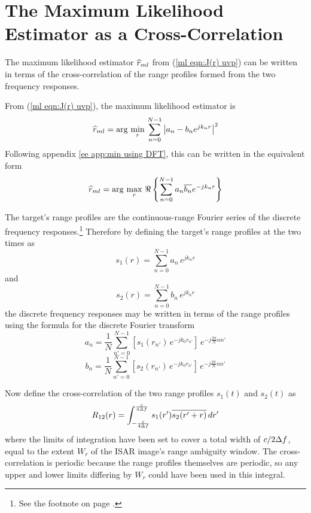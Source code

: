 \section[The ML Estimator as a Cross-Correlation]{The Maximum Likelihood
Estimator as a Cross-Correlation}
\label{do sec:mlcc}

The maximum likelihood estimator $\widehat{r}_{ml}$ from (\ref{ml eqn:J(r) uvp}) 
can be written in terms of the cross-correlation of the range profiles
formed from the two frequency responses.

From (\ref{ml eqn:J(r) uvp}), the maximum likelihood estimator is
\begin{equation}
\widehat{r}_{ml}=\arg\,\min_{{r}}\,\sum_{n=0}^{N-1} \left|a_n-b_n{e^{jk_n{r}}}\right|^2
\end{equation}
Following appendix \ref{ee app:min using DFT}, this can be written in the
equivalent form
\begin{equation}
\widehat{r}_{ml}=\arg\,\max_{{r}}\,\Re\left\{\sum_{n=0}^{N-1}a_n\overline{b_n}{e^{-jk_n{r}}}\right\}
\end{equation}

The target's range profiles are the continuous-range Fourier series of the
discrete frequency responses.\footnote{See the footnote on page 
\pageref{ee ftn:crft}.} Therefore by defining the target's range profiles at
the two times as
\begin{equation}
s_1(r)=\sum_{n=0}^{N-1} a_n\,e^{jk_n r}
\end{equation}
and
\begin{equation}
s_2(r)=\sum_{n=0}^{N-1} b_n\,e^{jk_n r}
\end{equation}
the discrete frequency responses may be written in terms of the range
profiles using the formula for the discrete Fourier transform
\begin{equation}
a_n=\frac{1}{N}\sum_{n'=0}^{N-1}\left[s_1(r_{n'})\,e^{-jk_0r_{n'}}
\right]\,e^{-j\frac{2\pi}{N}nn'}
\end{equation}
\begin{equation}
b_n=\frac{1}{N}\sum_{n'=0}^{N-1}\left[s_2(r_{n'})\,e^{-jk_0r_{n'}}
\right]\,e^{-j\frac{2\pi}{N}nn'}
\end{equation}

Now define the cross-correlation of the two range profiles $s_1(t)$ and
$s_2(t)$ as
\begin{equation}
R_{12}(r)=\int_{-\frac{c}{4{\Delta f}}}^{\frac{c}{4{\Delta f}}}
s_1(r')\overline{s_2(r'+r)}\,dr'
\label{do eqn:R12(r)}
\end{equation}
where the limits of integration have been set to cover a total width of
$c/2{\Delta f}$, equal to the extent $W_r$ of the ISAR image's range ambiguity window.  The
cross-correlation is periodic because the range profiles themselves are
periodic, so any upper and lower limits differing by $W_r$ could have been used
in this integral.

